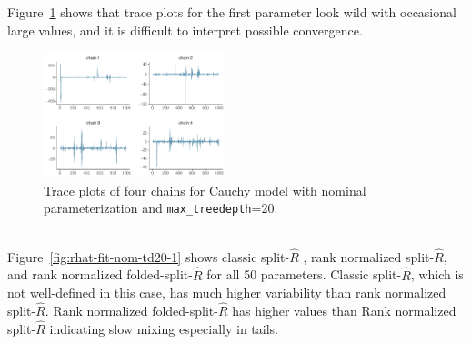 \documentclass[american,]{article}
\theoremstyle{definition}
\begin{document}
Figure~\ref{fig:trace-fit-nom-td20-1} shows that trace plots for the first
parameter look wild with occasional large values, and it is difficult
to interpret possible convergence.
\begin{figure}[tp]
  \centering
  \includegraphics[width=0.47\textwidth]{graphics/trace-fit-nom-td20-1.pdf}
  \caption{Trace plots of four chains for Cauchy model with nominal parameterization and \texttt{max\_treedepth}=20.\\~}
  \label{fig:trace-fit-nom-td20-1}
\end{figure}
%
Figure~\ref{fig:rhat-fit-nom-td20-1} shows classic split-\(\widehat{R}\) ,
rank normalized split-\(\widehat{R}\), and rank normalized
folded-split-\(\widehat{R}\) for all 50 parameters. Classic split-\(\widehat{R}\), which is
not well-defined in this case, has much higher variability than rank
normalized split-\(\widehat{R}\).  Rank normalized
folded-split-\(\widehat{R}\) has higher values than Rank normalized
split-\(\widehat{R}\) indicating slow mixing especially in tails.
\end{document}
